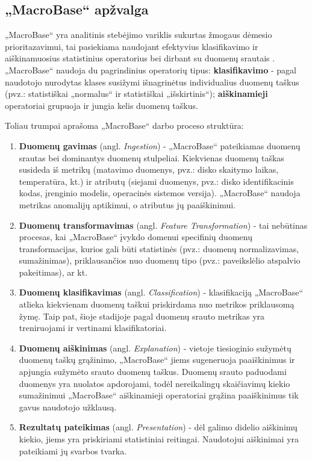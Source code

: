 \documentclass{VUMIFPSkursinis}
\begin{document}
\subsection{„MacroBase“ apžvalga} \label{subsec:macrobase_apžvalga}
„MacroBase“ yra analitinis stebėjimo variklis sukurtas žmogaus dėmesio prioritazavimui, tai pasiekiama naudojant efektyvius klasifikavimo ir aiškinamuosius statistinius operatorius bei dirbant su duomenų srautais \cite{macrobase_talk}. „MacroBase“ naudoja du pagrindinius operatorių tipus: \textbf{klasifikavimo} - pagal naudotojo nurodytas klases susižymi išnagrinėtus individualius duomenų taškus (pvz.: statistiškai „normalus“ ir statistiškai „išskirtinis“); \textbf{aiškinamieji} operatoriai grupuoja ir jungia kelis duomenų taškus.\par
Toliau trumpai aprašoma „MacroBase“ darbo proceso struktūra:

\begin{enumerate}
\item \textbf{Duomenų gavimas} (angl. \textit{Ingestion}) - „MacroBase“ pateikiamas duomenų srautas bei dominantys duomenų stulpeliai. Kiekvienas duomenų taškas susideda iš metrikų (matavimo duomenys, pvz.: disko skaitymo laikas, temperatūra, kt.) ir atributų (siejami duomenys, pvz.: disko identifikacinis kodas, įrenginio modelis, operacinės sistemos versija). „MacroBase“ naudoja metrikas anomalijų aptikimui, o atributus jų paaiškinimui.

\item \textbf{Duomenų transformavimas} (angl. \textit{Feature Transformation}) - tai nebūtinas procesas, kai „MacroBase“ įvykdo domenui specifinių duomenų transformacijas, kurios gali būti statistinės (pvz.: duomenų normalizavimas, sumažinimas), priklausančios nuo duomenų tipo (pvz.: paveikslėlio atspalvio pakeitimas), ar kt.

\item \textbf{Duomenų klasifikavimas} (angl. \textit{Classification}) - klasifikaciją  „MacroBase“ atlieka kiekvienam duomenų taškui priskirdama nuo metrikos priklausomą žymę. Taip pat, šioje stadijoje pagal duomenų srauto metrikas yra treniruojami ir vertinami klasifikatoriai.

\item \textbf{Duomenų aiškinimas} (angl. \textit{Explanation}) - vietoje tiesioginio sužymėtų duomenų taškų grąžinimo, „MacroBase“ jiems sugeneruoja paaiškinimus ir apjungia sužymėto srauto duomenų taškus. Duomenų srauto paduodami duomenys yra nuolatos apdorojami, todėl nereikalingų skaičiavimų kiekio sumažinimui „MacroBase“ aiškinamieji operatoriai grąžina paaiškinimus tik gavus naudotojo užklausą.

\item \textbf{Rezultatų pateikimas} (angl. \textit{Presentation}) - dėl galimo didelio aiškinimų kiekio, jiems yra priskiriami statistiniai reitingai. Naudotojui aiškinimai yra pateikiami jų svarbos tvarka.
\end{enumerate}
\end{document}
